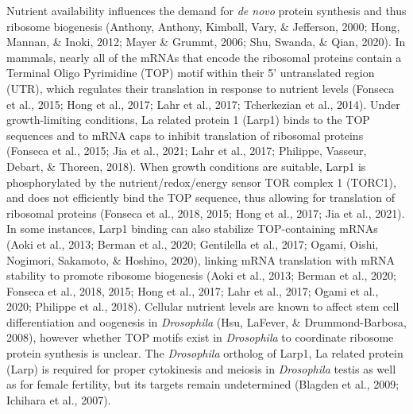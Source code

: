 \documentclass[12pt,twoside]{reedthesis}
\begin{document}
Nutrient availability influences the demand for \emph{de novo} protein
synthesis and thus ribosome biogenesis
(Anthony, Anthony, Kimball, Vary, \& Jefferson, 2000; Hong, Mannan, \& Inoki, 2012; Mayer \& Grummt, 2006; Shu, Swanda, \& Qian, 2020). In mammals, nearly all of the mRNAs that
encode the ribosomal proteins contain a Terminal Oligo Pyrimidine (TOP)
motif within their 5' untranslated region (UTR), which regulates their
translation in response to nutrient levels (Fonseca et al., 2015; Hong et al., 2017; Lahr et al., 2017; Tcherkezian et al., 2014). Under growth-limiting
conditions, La related protein 1 (Larp1) binds to the TOP sequences and
to mRNA caps to inhibit translation of ribosomal proteins
(Fonseca et al., 2015; Jia et al., 2021; Lahr et al., 2017; Philippe, Vasseur, Debart, \& Thoreen, 2018). When growth conditions are
suitable, Larp1 is phosphorylated by the nutrient/redox/energy sensor
TOR complex 1 (TORC1), and does not efficiently bind the TOP sequence,
thus allowing for translation of ribosomal proteins (Fonseca et al., 2018, 2015; Hong et al., 2017; Jia et al., 2021). In some instances, Larp1 binding can also
stabilize TOP-containing mRNAs (Aoki et al., 2013; Berman et al., 2020; Gentilella et al., 2017; Ogami, Oishi, Nogimori, Sakamoto, \& Hoshino, 2020), linking mRNA translation
with mRNA stability to promote ribosome biogenesis
(Aoki et al., 2013; Berman et al., 2020; Fonseca et al., 2018, 2015; Hong et al., 2017; Lahr et al., 2017; Ogami et al., 2020; Philippe et al., 2018). Cellular nutrient levels are
known to affect stem cell differentiation and oogenesis in \emph{Drosophila}
(Hsu, LaFever, \& Drummond-Barbosa, 2008), however whether TOP motifs exist in
\emph{Drosophila} to coordinate ribosome protein synthesis is unclear. The
\emph{Drosophila} ortholog of Larp1, La related protein (Larp) is required
for proper cytokinesis and meiosis in \emph{Drosophila} testis as well as for
female fertility, but its targets remain undetermined (Blagden et al., 2009; Ichihara et al., 2007).
\end{document}
